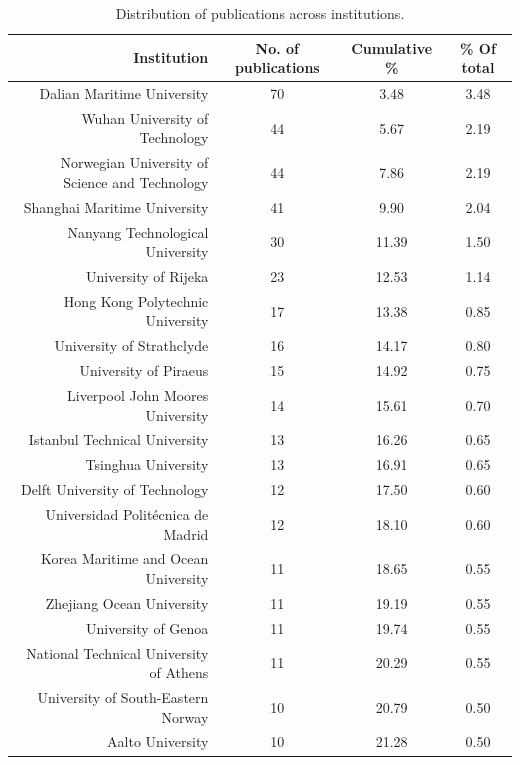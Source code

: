 \documentclass[a4paper, review, endfloat, authoryear]{elsarticle}
\begin{document}
	\begin{table}[h]
		\centering
		\caption{Distribution of publications across institutions.}
		\begin{tabular}{r c c c}
			\hline
			Institution & No. of publications & Cumulative \% & \% Of total \\
			\hline
			Dalian Maritime University & 70 & 3.48 & 3.48\\
			Wuhan University of Technology & 44 & 5.67 & 2.19\\
			Norwegian University of Science and Technology & 44 & 7.86 & 2.19\\
			Shanghai Maritime University & 41 & 9.90 & 2.04\\
			Nanyang Technological University & 30 & 11.39 & 1.50\\
			University of Rijeka & 23 & 12.53 & 1.14\\
			Hong Kong Polytechnic University & 17 & 13.38 & 0.85\\
			University of Strathclyde & 16 & 14.17 & 0.80\\
			University of Piraeus & 15 & 14.92 & 0.75\\
			Liverpool John Moores University & 14 & 15.61 & 0.70\\
			Istanbul Technical University & 13 & 16.26 & 0.65\\
			Tsinghua University & 13 & 16.91 & 0.65\\
			Delft University of Technology & 12 & 17.50 & 0.60\\
			Universidad Politécnica de Madrid & 12 & 18.10 & 0.60\\
			Korea Maritime and Ocean University & 11 & 18.65 & 0.55\\
			Zhejiang Ocean University & 11 & 19.19 & 0.55\\
			University of Genoa & 11 & 19.74 & 0.55\\
			National Technical University of Athens & 11 & 20.29 & 0.55\\
			University of South-Eastern Norway & 10 & 20.79 & 0.50\\
			Aalto University & 10 & 21.28 & 0.50\\
			\hline
		\end{tabular}
		\label{tab:resdescinst}
	\end{table}
\end{document}
